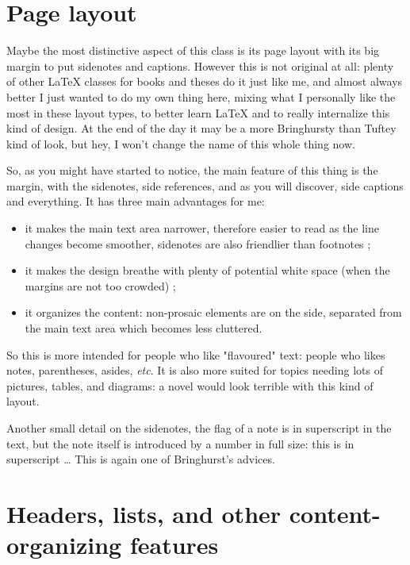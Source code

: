 \documentclass[
    11pt,
]{tufte-style-thesis}
\begin{document}
\section{Page layout}

Maybe the most distinctive aspect of this class is its page layout with its big margin to put sidenotes and captions. However this is not original at all: plenty\sidecite{} of other \LaTeX{} classes for books and theses do it just like me, and almost always better I just wanted to do my own thing here, mixing what I personally like the most in these layout types, to better learn \LaTeX{} and to really internalize this kind of design. At the end of the day it may be a more Bringhursty than Tuftey kind of look, but hey, I won't change the name of this whole thing now.

So, as you might have started to notice, the main feature of this thing is the margin, with the sidenotes, side references, and as you will discover, side captions and everything. It has three main advantages for me:
\begin{itemize}
  \item it makes the main text area narrower, therefore easier to read as the line changes become smoother, sidenotes are also friendlier than footnotes ;
  \item it makes the design breathe with plenty of potential white space (when the margins are not too crowded) ;
  \item it organizes the content: non-prosaic elements are on the side, separated from the main text area which becomes less cluttered.
\end{itemize}
So this is more intended for people who like "flavoured" text: people who likes notes, parentheses, asides, \textit{etc}. It is also more suited for topics needing lots of pictures, tables, and diagrams: a novel would look terrible with this kind of layout.

Another small detail on the sidenotes, the flag of a note is in superscript in the text, but the note itself is introduced by a number in full size: this is in superscript \dots{} This is again one of Bringhurst's advices.


\section{Headers, lists, and other content-organizing features}
\end{document}
